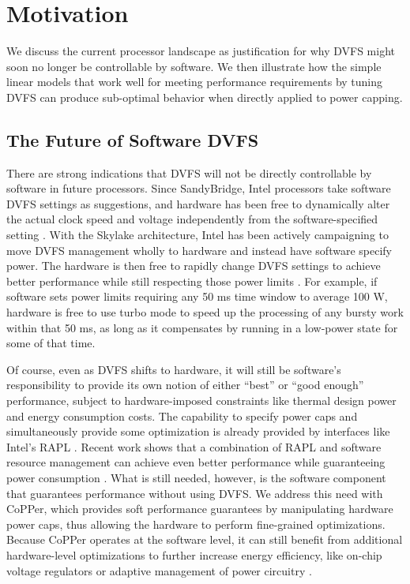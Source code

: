 \section{Motivation}
\label{sec:copper-motivation}

We discuss the current processor landscape as justification for why DVFS might soon no longer be controllable by software.
We then illustrate how the simple linear models that work well for meeting performance requirements by tuning DVFS can produce sub-optimal behavior when directly applied to power capping.


\subsection{The Future of Software DVFS}
There are strong indications that DVFS will not be directly controllable by software in future processors.
Since SandyBridge, Intel processors take software DVFS settings as suggestions, and hardware has been free to dynamically alter the actual clock speed and voltage independently from the software-specified setting \cite{lwn602479,KernelPstate}.
With the Skylake architecture, Intel has been actively campaigning to move DVFS management wholly to hardware and instead have software specify power.
The hardware is then free to rapidly change DVFS settings to achieve better performance while still respecting those power limits \cite{SpeedShift}.
For example, if software sets power limits requiring any 50 ms time window to average 100 W, hardware is free to use turbo mode to speed up the processing of any bursty work within that 50 ms, as long as it compensates by running in a low-power state for some of that time.

Of course, even as DVFS shifts to hardware, it will still be software's responsibility to provide its own notion of either ``best'' or ``good enough'' performance, subject to hardware-imposed constraints like thermal design power and energy consumption costs.
The capability to specify power caps and simultaneously provide some optimization is already provided by interfaces like Intel's RAPL \cite{RAPL}.
Recent work shows that a combination of RAPL and software resource management can achieve even better performance while guaranteeing power consumption \cite{pupil}.
What is still needed, however, is the software component that guarantees performance without using DVFS.
We address this need with CoPPer, which provides soft performance guarantees by manipulating hardware power caps, thus allowing the hardware to perform fine-grained optimizations.
Because CoPPer operates at the software level, it can still benefit from additional hardware-level optimizations to further increase energy efficiency, like on-chip voltage regulators \cite{Bai2017} or adaptive management of power circuitry \cite{He2013}.


